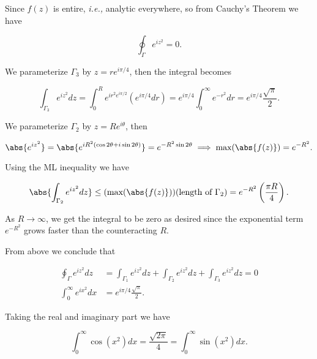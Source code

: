\documentclass[english,a4paper,12pt]{report}
\begin{document}
{Since \(f(z)\) is entire, \textit{i.e.,} analytic everywhere, so from Cauchy's Theorem we have

\begin{equation}
    \oint_{\Gamma } e^{iz^2} = 0.  
\end{equation}

We parameterize \(\Gamma _{3} \) by \(z = re^{i \pi /4} \), then the integral becomes 

\begin{equation}
    \int_{\Gamma _{3} }  e^{i z^2}dz = \int_{0}^{R} e^{i r^2 e^{i \pi /2} } (e^{i \pi /4}dr ) = e^{i \pi /4} \int_{0}^{\infty} e^{-r^2}dr = e^{i \pi /4} \frac{\sqrt{\pi } }{2}.  
\end{equation}

We parameterize \(\Gamma _{2} \) by \(z = Re^{i \theta } \), then

\begin{equation}
    \abs{e^{iz^2} } = \abs{e^{i R^2 (\cos 2\theta + i \sin 2\theta )} } = e^{-R^2\sin 2\theta }  \implies \text{max}(\abs{f(z)})= e^{-R^2}.  
\end{equation}

Using the ML inequality we have 

\begin{equation}
    \abs{\int_{\Gamma _{2} }^{} e^{i z^2}dz } \le (\text{max} (\abs{f(z)} ))  (\text{length of } \Gamma _{2} ) = e^{-R^2} \left( \frac{\pi R}{4}  \right).
\end{equation}

As \(R \to \infty\), we get the integral to be zero as desired since the exponential term \(e^{-R^2} \) grows faster than the counteracting \(R\).

From above we conclude that 

\begin{equation}
    \begin{aligned} 
    \oint_{\Gamma }e^{i z^2}dz &= \int_{\Gamma _{1} }^{} e^{i z^2} dz + \int_{\Gamma _{2} }^{} e^{i z^2}dz + \int_{\Gamma _{3} }^{}   e^{i z^2}dz = 0 \\
    \int_{0}^{\infty} e^{i x^2}dx &= e^{i \pi /4} \frac{\sqrt{\pi } }{2}.
    \end{aligned}       
\end{equation}

Taking the real and imaginary part we have

\begin{equation}
    \int_{0}^{\infty} \cos (x^2)dx = \frac{\sqrt{2\pi } }{4} = \int_{0}^{\infty} \sin (x^2)dx.     
\end{equation}
~
} 
\end{document}
